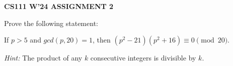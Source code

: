 \documentclass{article}
\begin{document}
\centerline{\large \bf CS111 W'24 ASSIGNMENT 2}

\vskip 0.2in

\begin{problem}

\vspace{0.05in}
\noindent  Prove the following statement: 


\noindent 
If $p > 5$ and $gcd(p, 20) = 1$,
then $(p^2 -21)(p^2 +16)\equiv 0 \pmod{20}$.

\vspace{0.1in}
\noindent  
\emph{Hint:} 
The product of any $k$ consecutive integers is divisible by $k$.



\end{problem}
\end{document}

